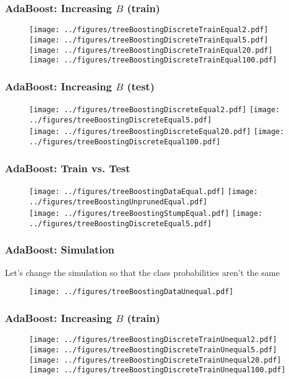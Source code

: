 \documentclass[12pt]{beamer}
\begin{document}
\begin{frame}[fragile]
\frametitle{AdaBoost: Increasing $B$ (train)}
\begin{figure}
\texttt{[image: ../figures/treeBoostingDiscreteTrainEqual2.pdf]}
\texttt{[image: ../figures/treeBoostingDiscreteTrainEqual5.pdf]} \\
\texttt{[image: ../figures/treeBoostingDiscreteTrainEqual20.pdf]}
\texttt{[image: ../figures/treeBoostingDiscreteTrainEqual100.pdf]}
\end{figure}
\end{frame}


\begin{frame}[fragile]
\frametitle{AdaBoost: Increasing $B$ (test)}
\begin{figure}
\texttt{[image: ../figures/treeBoostingDiscreteEqual2.pdf]}
\texttt{[image: ../figures/treeBoostingDiscreteEqual5.pdf]} \\
\texttt{[image: ../figures/treeBoostingDiscreteEqual20.pdf]}
\texttt{[image: ../figures/treeBoostingDiscreteEqual100.pdf]}
\end{figure}
\end{frame}

\begin{frame}[fragile]
\frametitle{AdaBoost: Train vs. Test}
\begin{figure}
\texttt{[image: ../figures/treeBoostingDataEqual.pdf]}
\texttt{[image: ../figures/treeBoostingUnprunedEqual.pdf]} \\
\texttt{[image: ../figures/treeBoostingStumpEqual.pdf]}
\texttt{[image: ../figures/treeBoostingDiscreteEqual5.pdf]}
\end{figure}
\end{frame}


\begin{frame}[fragile]
\frametitle{AdaBoost: Simulation}
Let's change the simulation so that the class probabilities aren't the same
\begin{figure}
\texttt{[image: ../figures/treeBoostingDataUnequal.pdf]}
\end{figure}
\end{frame}


\begin{frame}[fragile]
\frametitle{AdaBoost: Increasing $B$ (train)}
\begin{figure}
\texttt{[image: ../figures/treeBoostingDiscreteTrainUnequal2.pdf]}
\texttt{[image: ../figures/treeBoostingDiscreteTrainUnequal5.pdf]} \\
\texttt{[image: ../figures/treeBoostingDiscreteTrainUnequal20.pdf]}
\texttt{[image: ../figures/treeBoostingDiscreteTrainUnequal100.pdf]}
\end{figure}
\end{frame}
\end{document}
